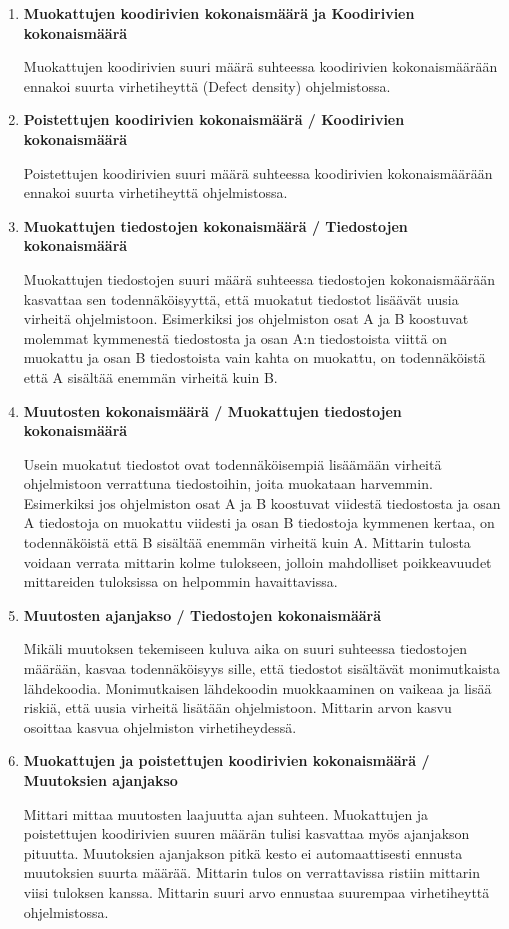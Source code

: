 \documentclass[finnish]{tktltiki2}
\theoremstyle{definition}
\theoremstyle{remark}
\begin{document}
\begin{enumerate}
    \item \textbf{Muokattujen koodirivien kokonaismäärä ja Koodirivien kokonaismäärä}

      Muokattujen koodirivien suuri määrä suhteessa koodirivien kokonaismäärään ennakoi suurta virhetiheyttä (Defect density) ohjelmistossa.
    \item \textbf{Poistettujen koodirivien kokonaismäärä / Koodirivien kokonaismäärä}

      Poistettujen koodirivien suuri määrä suhteessa koodirivien kokonaismäärään ennakoi suurta virhetiheyttä ohjelmistossa.
    \item \textbf{Muokattujen tiedostojen kokonaismäärä / Tiedostojen kokonaismäärä}

      Muokattujen tiedostojen suuri määrä suhteessa tiedostojen kokonaismäärään kasvattaa sen todennäköisyyttä, että muokatut tiedostot lisäävät uusia virheitä ohjelmistoon. Esimerkiksi jos ohjelmiston osat A ja B koostuvat molemmat kymmenestä tiedostosta ja osan A:n tiedostoista viittä on muokattu ja osan B tiedostoista vain kahta on muokattu, on todennäköistä että A sisältää enemmän virheitä kuin B.
    \item \textbf{Muutosten kokonaismäärä / Muokattujen tiedostojen kokonaismäärä}

      Usein muokatut tiedostot ovat todennäköisempiä lisäämään virheitä ohjelmistoon verrattuna tiedostoihin, joita muokataan harvemmin. Esimerkiksi jos ohjelmiston osat A ja B koostuvat viidestä tiedostosta ja osan A tiedostoja on muokattu viidesti ja osan B tiedostoja kymmenen kertaa, on todennäköistä että B sisältää enemmän virheitä kuin A. Mittarin tulosta voidaan verrata mittarin kolme tulokseen, jolloin mahdolliset poikkeavuudet mittareiden tuloksissa on helpommin havaittavissa.
    \item \textbf{Muutosten ajanjakso / Tiedostojen kokonaismäärä}

      Mikäli muutoksen tekemiseen kuluva aika on suuri suhteessa tiedostojen määrään, kasvaa todennäköisyys sille, että tiedostot sisältävät monimutkaista lähdekoodia. Monimutkaisen lähdekoodin muokkaaminen on vaikeaa ja lisää riskiä, että uusia virheitä lisätään ohjelmistoon. Mittarin arvon kasvu osoittaa kasvua ohjelmiston virhetiheydessä.
    \item \textbf{Muokattujen ja poistettujen koodirivien kokonaismäärä / Muutoksien ajanjakso}

      Mittari mittaa muutosten laajuutta ajan suhteen. Muokattujen ja poistettujen koodirivien suuren määrän tulisi kasvattaa myös ajanjakson pituutta. Muutoksien ajanjakson pitkä kesto ei automaattisesti ennusta muutoksien suurta määrää. Mittarin tulos on verrattavissa ristiin mittarin viisi tuloksen kanssa. Mittarin suuri arvo ennustaa suurempaa virhetiheyttä ohjelmistossa.


\end{enumerate}
\end{document}
